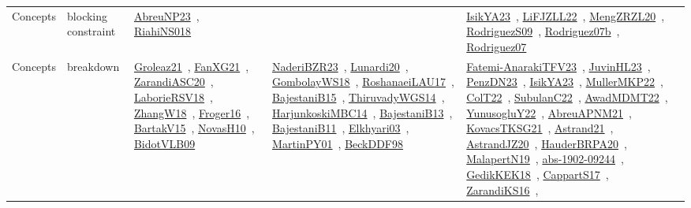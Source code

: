 {\begin{longtable}{lp{3cm}>{\raggedright\arraybackslash}p{6cm}>{\raggedright\arraybackslash}p{6cm}>{\raggedright\arraybackslash}p{8cm}}
Concepts & blocking constraint & \href{../works/AbreuNP23.pdf}{AbreuNP23}~\cite{AbreuNP23}, \href{../works/RiahiNS018.pdf}{RiahiNS018}~\cite{RiahiNS018} &  & \href{../works/IsikYA23.pdf}{IsikYA23}~\cite{IsikYA23}, \href{../works/LiFJZLL22.pdf}{LiFJZLL22}~\cite{LiFJZLL22}, \href{../works/MengZRZL20.pdf}{MengZRZL20}~\cite{MengZRZL20}, \href{../works/RodriguezS09.pdf}{RodriguezS09}~\cite{RodriguezS09}, \href{../works/Rodriguez07b.pdf}{Rodriguez07b}~\cite{Rodriguez07b}, \href{../works/Rodriguez07.pdf}{Rodriguez07}~\cite{Rodriguez07}\\
Concepts & breakdown & \href{../works/Groleaz21.pdf}{Groleaz21}~\cite{Groleaz21}, \href{../works/FanXG21.pdf}{FanXG21}~\cite{FanXG21}, \href{../works/ZarandiASC20.pdf}{ZarandiASC20}~\cite{ZarandiASC20}, \href{../works/LaborieRSV18.pdf}{LaborieRSV18}~\cite{LaborieRSV18}, \href{../works/ZhangW18.pdf}{ZhangW18}~\cite{ZhangW18}, \href{../works/Froger16.pdf}{Froger16}~\cite{Froger16}, \href{../works/BartakV15.pdf}{BartakV15}~\cite{BartakV15}, \href{../works/NovasH10.pdf}{NovasH10}~\cite{NovasH10}, \href{../works/BidotVLB09.pdf}{BidotVLB09}~\cite{BidotVLB09} & \href{../works/NaderiBZR23.pdf}{NaderiBZR23}~\cite{NaderiBZR23}, \href{../works/Lunardi20.pdf}{Lunardi20}~\cite{Lunardi20}, \href{../works/GombolayWS18.pdf}{GombolayWS18}~\cite{GombolayWS18}, \href{../works/RoshanaeiLAU17.pdf}{RoshanaeiLAU17}~\cite{RoshanaeiLAU17}, \href{../works/BajestaniB15.pdf}{BajestaniB15}~\cite{BajestaniB15}, \href{../works/ThiruvadyWGS14.pdf}{ThiruvadyWGS14}~\cite{ThiruvadyWGS14}, \href{../works/HarjunkoskiMBC14.pdf}{HarjunkoskiMBC14}~\cite{HarjunkoskiMBC14}, \href{../works/BajestaniB13.pdf}{BajestaniB13}~\cite{BajestaniB13}, \href{../works/BajestaniB11.pdf}{BajestaniB11}~\cite{BajestaniB11}, \href{../works/Elkhyari03.pdf}{Elkhyari03}~\cite{Elkhyari03}, \href{../works/MartinPY01.pdf}{MartinPY01}~\cite{MartinPY01}, \href{../works/BeckDDF98.pdf}{BeckDDF98}~\cite{BeckDDF98} & \href{../works/Fatemi-AnarakiTFV23.pdf}{Fatemi-AnarakiTFV23}~\cite{Fatemi-AnarakiTFV23}, \href{../works/JuvinHL23.pdf}{JuvinHL23}~\cite{JuvinHL23}, \href{../works/PenzDN23.pdf}{PenzDN23}~\cite{PenzDN23}, \href{../works/IsikYA23.pdf}{IsikYA23}~\cite{IsikYA23}, \href{../works/MullerMKP22.pdf}{MullerMKP22}~\cite{MullerMKP22}, \href{../works/ColT22.pdf}{ColT22}~\cite{ColT22}, \href{../works/SubulanC22.pdf}{SubulanC22}~\cite{SubulanC22}, \href{../works/AwadMDMT22.pdf}{AwadMDMT22}~\cite{AwadMDMT22}, \href{../works/YunusogluY22.pdf}{YunusogluY22}~\cite{YunusogluY22}, \href{../works/AbreuAPNM21.pdf}{AbreuAPNM21}~\cite{AbreuAPNM21}, \href{../works/KovacsTKSG21.pdf}{KovacsTKSG21}~\cite{KovacsTKSG21}, \href{../works/Astrand21.pdf}{Astrand21}~\cite{Astrand21}, \href{../works/AstrandJZ20.pdf}{AstrandJZ20}~\cite{AstrandJZ20}, \href{../works/HauderBRPA20.pdf}{HauderBRPA20}~\cite{HauderBRPA20}, \href{../works/MalapertN19.pdf}{MalapertN19}~\cite{MalapertN19}, \href{../works/abs-1902-09244.pdf}{abs-1902-09244}~\cite{abs-1902-09244}, \href{../works/GedikKEK18.pdf}{GedikKEK18}~\cite{GedikKEK18}, \href{../works/CappartS17.pdf}{CappartS17}~\cite{CappartS17}, \href{../works/ZarandiKS16.pdf}{ZarandiKS16}~\cite{ZarandiKS16}, 
\end{longtable}}
